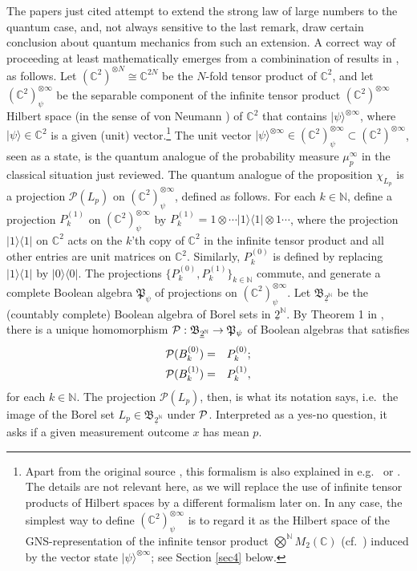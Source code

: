 \documentclass[12pt]{article}
\newcommand{\raw}{\rightarrow} \newcommand{\rat}{\mapsto}
\newcommand{\ot}{\otimes}
\newcommand{\la}{\langle} \newcommand{\ra}{\rangle}
\newcommand{\ch}{\chi} \newcommand{\ps}{\psi} \newcommand{\Ps}{\Psi}
\newcommand{\C}{{\mathbb C}} \newcommand{\D}{{\mathbb D}}
\newcommand{\N}{{\mathbb N}} \newcommand{\R}{{\mathbb R}}
\newcommand{\ut}{\underline{2}}
\begin{document}
The papers just cited attempt to extend the strong law of large numbers to the quantum case, and, not always sensitive to the last remark, draw certain conclusion about quantum mechanics from such an extension. A correct way of proceeding at least mathematically 
emerges from a combinination of results in \cite{14,vW}, as follows. Let $(\C^2)^{\ot N}\cong \C^{2N}$ be the $N$-fold tensor product of $\C^2$, and let $(\C^2)_{\ps}^{\ot\infty}$ be the separable component of the infinite tensor product $(\C^2)^{\ot\infty}$ Hilbert space (in the sense of von Neumann \cite{vNC}) of $\C^2$ that contains $|\ps\ra^{\ot\infty}$, where $|\ps\ra\in\C^2$ is a given (unit) vector.\footnote{Apart from the original source \cite{vNC}, this formalism is also explained
in e.g.\ \cite{14} or \cite[\S 6.2]{EK}. The details are not relevant here, as we will replace the use of infinite tensor products of Hilbert spaces by a different formalism later on. In any case, the simplest way to define $(\C^2)_{\ps}^{\ot\infty}$ is to regard it as the Hilbert space of the GNS-representation of the infinite tensor product $\bigotimes^{\N} M_2(\C)$ (cf.\ \cite[\S 11.4]{KR2})
induced by  the vector state $|\ps\ra^{\ot\infty}$;
see Section \ref{sec4} below.} The unit vector  $|\ps\ra^{\ot\infty}\in (\C^2)_{\ps}^{\ot\infty}\subset  (\C^2)^{\ot\infty}$, seen as a state, is the quantum analogue of the probability measure $\mu_p^{\infty}$ in the classical situation just reviewed.
The quantum analogue of the proposition $\ch_{L_p}$ is a projection $\mathcal{P}(L_p)$
on $(\C^2)_{\ps}^{\ot\infty}$, defined as follows. For each $k\in \N$, define a projection
$P^{(1)}_k$ on $(\C^2)_{\ps}^{\ot\infty}$ by $P^{(1)}_k=1\ot\cdots |1\ra\la 1|\ot 1\cdots$, where the projection $|1\ra\la 1|$ on $\C^2$ acts on the $k$'th copy of $\C^2$ in the infinite tensor product and all other entries are unit matrices on $\C^2$. Similarly, $P^{(0)}_k$ is defined by replacing $|1\ra\la 1|$ by $|0\ra\la 0|$. 
The projections $\{P^{(0)}_k,P^{(1)}_k\}_{k\in\N}$ commute, and generate a complete Boolean algebra $\mathfrak{P}_{\ps}$ of projections on $(\C^2)_{\ps}^{\ot\infty}$. Let $\mathfrak{B}_{\ut^\N}$ be the (countably complete) Boolean algebra of Borel sets in $\ut^\N$.
By  Theorem 1 in \cite{vW}, there is a  unique homomorphism 
$\CP:\mathfrak{B}_{\ut^\N}\raw \mathfrak{P}_{\ps}$ of Boolean algebras that satisfies
\begin{eqnarray}
{\mathcal P}(B_k^{(0)})&=&P^{(0)}_k;\nonumber\\
{\mathcal P}(B_k^{(1)})&=&P^{(1)}_k,
\end{eqnarray}
for each $k\in\N$.  The projection  $\mathcal{P}(L_p)$, then,
is what its notation says, i.e.\  the image of the Borel set $L_p\in\mathfrak{B}_{\ut^\N}$
 under ${\mathcal P}$. Interpreted as a yes-no question, it asks if a given measurement outcome $x$ has mean $p$.
\end{document}
